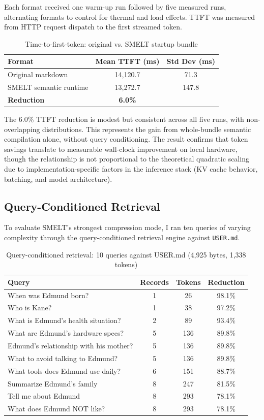 \documentclass[11pt,a4paper]{article}
\begin{document}
Each format received one warm-up run followed by five measured runs, alternating formats to control for thermal and load effects. TTFT was measured from HTTP request dispatch to the first streamed token.

\begin{table}[H]
\centering
\caption{Time-to-first-token: original vs. SMELT startup bundle}
\begin{tabular}{lcc}
\toprule
\textbf{Format} & \textbf{Mean TTFT (ms)} & \textbf{Std Dev (ms)} \\
\midrule
Original markdown & 14,120.7 & 71.3 \\
SMELT semantic runtime & 13,272.7 & 147.8 \\
\midrule
\textbf{Reduction} & \textbf{6.0\%} & \\
\bottomrule
\end{tabular}
\end{table}

The 6.0\% TTFT reduction is modest but consistent across all five runs, with non-overlapping distributions. This represents the gain from whole-bundle semantic compilation alone, without query conditioning. The result confirms that token savings translate to measurable wall-clock improvement on local hardware, though the relationship is not proportional to the theoretical quadratic scaling due to implementation-specific factors in the inference stack (KV cache behavior, batching, and model architecture).

\subsection{Query-Conditioned Retrieval}

To evaluate SMELT's strongest compression mode, I ran ten queries of varying complexity through the query-conditioned retrieval engine against \texttt{USER.md}.

\begin{table}[H]
\centering
\caption{Query-conditioned retrieval: 10 queries against USER.md (4,925 bytes, 1,338 tokens)}
\begin{tabular}{lccc}
\toprule
\textbf{Query} & \textbf{Records} & \textbf{Tokens} & \textbf{Reduction} \\
\midrule
When was Edmund born? & 1 & 26 & 98.1\% \\
Who is Kane? & 1 & 38 & 97.2\% \\
What is Edmund's health situation? & 2 & 89 & 93.4\% \\
What are Edmund's hardware specs? & 5 & 136 & 89.8\% \\
Edmund's relationship with his mother? & 5 & 136 & 89.8\% \\
What to avoid talking to Edmund? & 5 & 136 & 89.8\% \\
What tools does Edmund use daily? & 6 & 151 & 88.7\% \\
Summarize Edmund's family & 8 & 247 & 81.5\% \\
Tell me about Edmund & 8 & 293 & 78.1\% \\
What does Edmund NOT like? & 8 & 293 & 78.1\% \\
\bottomrule
\end{tabular}
\end{table}
\end{document}
